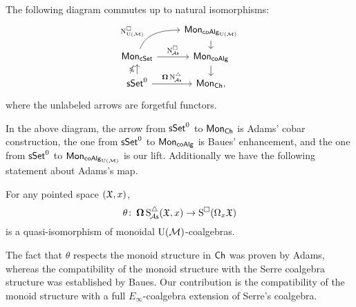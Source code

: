 
\begin{theorem*}
	The following diagram commutes up to natural isomorphisms:
	\[
	\begin{tikzcd} [row sep=small]
		& \Mon_{\coAlg_\UM} \arrow[d] \\
		\Mon_{\cSet} \arrow[ru, "\cchainsUM", out=70, in=180, near start] \arrow[r, "\cchainsA"]
		& \Mon_{\coAlg} \arrow[d] \\
		\sSet^0 \arrow[r, "\cobar \schainsA"] \arrow[u, "\ccobar"]
		& \Mon_{\Ch},
	\end{tikzcd}
	\]
	where the unlabeled arrows are forgetful functors.
\end{theorem*}

In the above diagram, the arrow from $\mathsf{sSet}^0$ to $\mathsf{Mon}_{\mathsf{Ch}}$ is Adams' cobar construction, the one from $\mathsf{sSet}^0$ to $\mathsf{Mon}_{\mathsf{coAlg}}$ is Baues' enhancement, and the one from $\mathsf{sSet}^0$ to $\mathsf{Mon}_{\mathsf{coAlg}_{{\operatorname{U}(\mathcal{M})}}}$ is our lift.
Additionally we have the following statement about Adams's map.

\begin{theorem*}
	For any pointed space $(\mathfrak{X}, x)$,
	\[
	\theta \colon \operatorname{\mathbf{\Omega}} \operatorname{S^{\triangle}_{\!{\mathcal{A}\mathsf{s}}}}(\mathfrak{X}, x) \to \operatorname{S^{\square}}(\Omega_x \mathfrak{X})
	\]
	is a quasi-isomorphism of monoidal ${\operatorname{U}(\mathcal{M})}$-coalgebras.
\end{theorem*}

The fact that $\theta$ respects the monoid structure in $\mathsf{Ch}$ was proven by Adams, whereas the compatibility of the monoid structure with the Serre coalgebra structure was established by Baues.
Our contribution is the compatibility of the monoid structure with a full $E_\infty$-coalgebra extension of Serre's coalgebra.